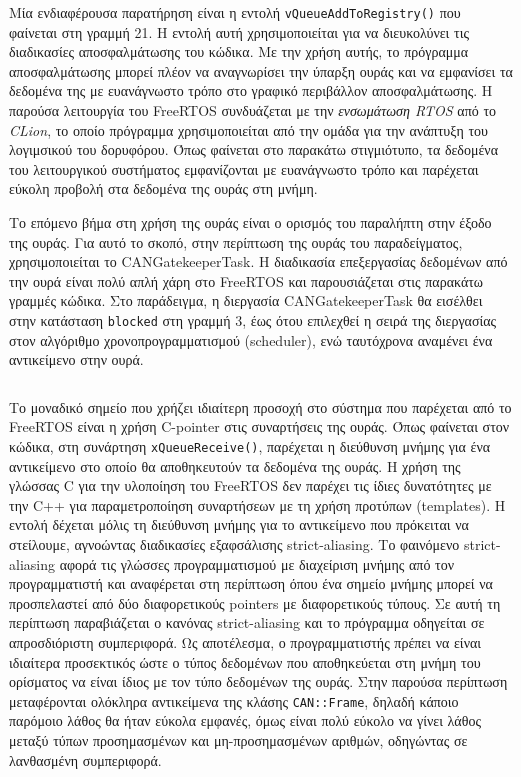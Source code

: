 \documentclass[a4paper,nobib,justified]{tufte-book}
\begin{document}
Μία ενδιαφέρουσα παρατήρηση είναι η εντολή \texttt{vQueueAddToRegistry()} που φαίνεται στη γραμμή 21. Η εντολή αυτή χρησιμοποιείται για να διευκολύνει τις διαδικασίες αποσφαλμάτωσης του κώδικα. Με την χρήση αυτής, το πρόγραμμα αποσφαλμάτωσης μπορεί πλέον να αναγνωρίσει την ύπαρξη ουράς και να εμφανίσει τα δεδομένα της με ευανάγνωστο τρόπο στο γραφικό περιβάλλον αποσφαλμάτωσης. Η παρούσα λειτουργία του FreeRTOS συνδυάζεται με την \emph{ενσωμάτωση RTOS} από το \emph{CLion}, το οποίο πρόγραμμα χρησιμοποιείται από την ομάδα για την ανάπτυξη του λογιμσικού του δορυφόρου. Όπως φαίνεται στο παρακάτω στιγμιότυπο, τα δεδομένα του λειτουργικού συστήματος εμφανίζονται με ευανάγνωστο τρόπο και παρέχεται εύκολη προβολή στα δεδομένα της ουράς στη μνήμη. 

Το επόμενο βήμα στη χρήση της ουράς είναι ο ορισμός του παραλήπτη στην έξοδο της ουράς. Για αυτό το σκοπό, στην περίπτωση της ουράς του παραδείγματος, χρησιμοποιείται το CANGatekeeperTask. Η διαδικασία επεξεργασίας δεδομένων από την ουρά είναι πολύ απλή χάρη στο FreeRTOS και παρουσιάζεται στις παρακάτω γραμμές κώδικα. Στο παράδειγμα, η διεργασία CANGatekeeperTask θα εισέλθει στην κατάσταση \texttt{blocked} στη γραμμή 3, έως ότου επιλεχθεί η σειρά της διεργασίας στον αλγόριθμο χρονοπρογραμματισμού (scheduler), ενώ ταυτόχρονα αναμένει ένα αντικείμενο στην ουρά.
\inputminted{c++}{code/examples/gatekeeper-execute-short.cpp}

Το μοναδικό σημείο που χρήζει ιδιαίτερη προσοχή στο σύστημα που παρέχεται από το FreeRTOS είναι η χρήση C-pointer στις συναρτήσεις της ουράς. Όπως φαίνεται στον κώδικα, στη συνάρτηση \texttt{xQueueReceive()}, παρέχεται η διεύθυνση μνήμης για ένα αντικείμενο στο οποίο θα αποθηκευτούν τα δεδομένα της ουράς. Η χρήση της γλώσσας C για την υλοποίηση του FreeRTOS δεν παρέχει τις ίδιες δυνατότητες με την C++ για παραμετροποίηση συναρτήσεων με τη χρήση προτύπων (templates). Η εντολή δέχεται μόλις τη διεύθυνση μνήμης για το αντικείμενο που πρόκειται να στείλουμε, αγνοώντας διαδικασίες εξαφσάλισης strict-aliasing. Το φαινόμενο strict-aliasing αφορά τις γλώσσες προγραμματισμού με διαχείριση μνήμης από τον προγραμματιστή και αναφέρεται στη περίπτωση όπου ένα σημείο μνήμης μπορεί να προσπελαστεί από δύο διαφορετικούς pointers με διαφορετικούς τύπους. Σε αυτή τη περίπτωση παραβιάζεται ο κανόνας strict-aliasing και το πρόγραμμα οδηγείται σε απροσδιόριστη συμπεριφορά. Ως αποτέλεσμα, ο προγραμματιστής πρέπει να είναι ιδιαίτερα προσεκτικός ώστε ο τύπος δεδομένων που αποθηκεύεται στη μνήμη του ορίσματος να είναι ίδιος με τον τύπο δεδομένων της ουράς. Στην παρούσα περίπτωση μεταφέρονται ολόκληρα αντικείμενα της κλάσης \texttt{CAN::Frame}, δηλαδή κάποιο παρόμοιο λάθος θα ήταν εύκολα εμφανές, όμως είναι πολύ εύκολο να γίνει λάθος μεταξύ τύπων προσημασμένων και μη-προσημασμένων αριθμών, οδηγώντας σε λανθασμένη συμπεριφορά.
\end{document}
